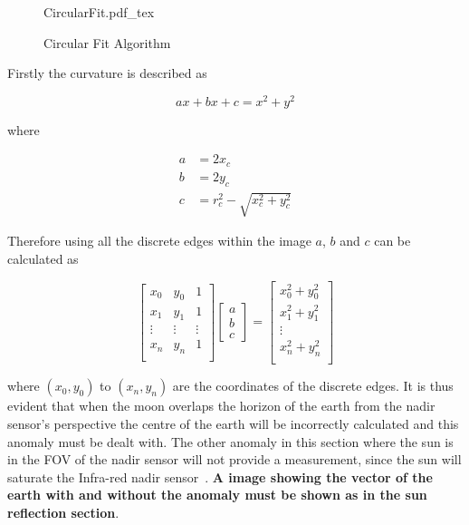 \begin{figure}[!hbt]
	\centering
	\def\svgwidth{14cm}
	{CircularFit.pdf_tex}
	\caption{Circular Fit Algorithm}
	\label{fig:CircularFit}
\end{figure}

Firstly the curvature is described as 

\begin{equation}
	ax + bx + c = x^2 + y^2
\end{equation}

where 

\begin{equation}
	\begin{aligned}
		a &= 2x_c \\
		b &= 2y_c \\
		c &= r_c^2-\sqrt{x_c^2 + y_c^2}
	\end{aligned}
\end{equation}

Therefore using all the discrete edges within the image $a$, $b$ and $c$ can be calculated as

\begin{equation}
	\begin{bmatrix}
		x_0 & y_0 & 1\\
		x_1 & y_1 & 1\\
		\vdots & \vdots & \vdots\\
		x_n & y_n & 1\\
	\end{bmatrix}	\begin{bmatrix}
	a\\
	b\\
	c
\end{bmatrix} = \begin{bmatrix}
		x_0^2 + y_0^2\\
		x_1^2 + y_1^2\\
		\vdots \\
		x_n^2 + y_n^2\\
	\end{bmatrix}
\end{equation}

where $(x_0,y_0)$ to $(x_n, y_n)$ are the coordinates of the discrete edges. It is thus evident that when the moon overlaps the horizon of the earth from the nadir sensor's perspective the centre of the earth will be incorrectly calculated and this anomaly must be dealt with. The other anomaly in this section where the sun is in the FOV of the nadir sensor will not provide a measurement, since the sun will saturate the Infra-red nadir sensor~\cite{Wessels2018}. \textbf{A image showing the vector of the earth with and without the anomaly must be shown as in the sun reflection section}.

